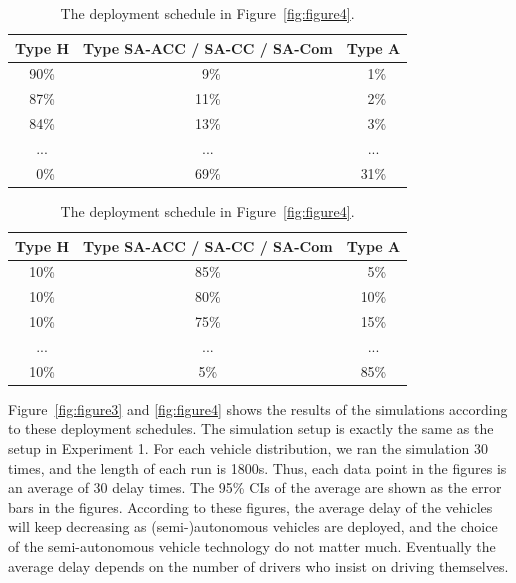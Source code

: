 \begin{table}[t]

\caption{The deployment schedule in Figure~\ref{fig:figure3}.}
\label{table:3}
\centering
\small
\begin{tabular}{|c|c|c|}
    \hline
    Type H&  Type SA-ACC / SA-CC / SA-Com &    Type A\\
    \hline
    90\% &      \ 9\% &   \ 1\% \\
    \hline
    87\% &     11\% &    \ 2\% \\
    \hline
    84\% &     13\% &    \ 3\% \\
    \hline
     ...&   ...&   ...\\
    \hline
    \ 0\%&     69\% &  31\% \\
    \hline
\end{tabular}

\mbox{}

\caption{The deployment schedule in Figure~\ref{fig:figure4}.}
\label{table:4}
\centering
\small
\begin{tabular}{|c|c|c|}
    \hline
     Type H&  Type SA-ACC / SA-CC / SA-Com &    Type A\\
    \hline
     10\%&     85\%&   \ 5\% \\
    \hline
     10\%&     80\%&  10\% \\
    \hline
     10\%&     75\%&  15\% \\
    \hline
      ...&  ... &  ...\\
    \hline
     10\%&       5\%&  85\% \\
    \hline
\end{tabular}

\end{table}

Figure~\ref{fig:figure3} and \ref{fig:figure4} shows the results of
the simulations according to these deployment schedules.  The
simulation setup is exactly the same as the setup in Experiment 1.
For each vehicle distribution, we ran the simulation 30 times, and the
length of each run is 1800s.  Thus, each data point in the figures is
an average of 30 delay times.  The 95\% CIs of the average are shown
as the error bars in the figures.  According to these figures, the
average delay of the vehicles will keep decreasing as
(semi-)autonomous vehicles are deployed, and the choice of the
semi-autonomous vehicle technology do not matter much.  Eventually the
average delay depends on the number of drivers who insist on driving
themselves.

